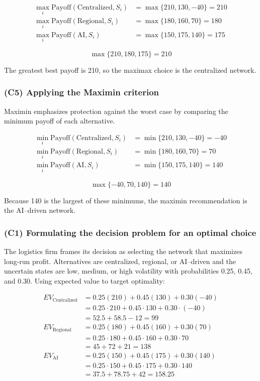 \[
\begin{aligned}
\max_i \text{Payoff}(\text{Centralized}, S_i) &= \max\{210, 130, -40\} = 210\\
\max_i \text{Payoff}(\text{Regional}, S_i) &= \max\{180, 160, 70\} = 180\\
\max_i \text{Payoff}(\text{AI}, S_i) &= \max\{150, 175, 140\} = 175
\end{aligned}
\]

\[
\max\{210, 180, 175\} = 210
\]

The greatest best payoff is 210, so the maximax choice is the centralized network.

\subsubsection{(C5) Applying the Maximin criterion}\label{subsubsec:practice-activity-1-solution-3-c5}

Maximin emphasizes protection against the worst case by comparing the minimum payoff of each alternative.

\[
\begin{aligned}
\min_i \text{Payoff}(\text{Centralized}, S_i) &= \min\{210, 130, -40\} = -40\\
\min_i \text{Payoff}(\text{Regional}, S_i) &= \min\{180, 160, 70\} = 70\\
\min_i \text{Payoff}(\text{AI}, S_i) &= \min\{150, 175, 140\} = 140
\end{aligned}
\]

\[
\max\{-40, 70, 140\} = 140
\]

Because 140 is the largest of these minimums, the maximin recommendation is the AI--driven network.

\subsubsection{(C1) Formulating the decision problem for an optimal choice}\label{subsubsec:practice-activity-1-solution-3-c1}

The logistics firm frames its decision as selecting the network that maximizes long-run profit. Alternatives are
centralized, regional, or AI--driven and the uncertain states are
low, medium, or high volatility with probabilities 0.25, 0.45, and
0.30. Using expected value to target optimality:

\[
\begin{aligned}
EV_{\text{Centralized}} &= 0.25(210) + 0.45(130) + 0.30(-40) \\
&= 0.25\cdot210 + 0.45\cdot130 + 0.30\cdot(-40) \\
&= 52.5 + 58.5 - 12 = 99 \\
EV_{\text{Regional}} &= 0.25(180) + 0.45(160) + 0.30(70) \\
&= 0.25\cdot180 + 0.45\cdot160 + 0.30\cdot70 \\
&= 45 + 72 + 21 = 138 \\
EV_{\text{AI}} &= 0.25(150) + 0.45(175) + 0.30(140) \\
&= 0.25\cdot150 + 0.45\cdot175 + 0.30\cdot140 \\
&= 37.5 + 78.75 + 42 = 158.25
\end{aligned}
\]

